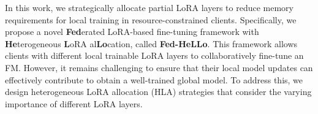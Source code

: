 \documentclass[lettersize,journal]{IEEEtran}
\begin{document}
In this work, we strategically allocate partial LoRA layers to reduce memory requirements for local training in resource-constrained clients.
Specifically, we propose a novel \textbf{Fed}erated LoRA-based fine-tuning framework with \textbf{He}terogeneous \textbf{L}oRA al\textbf{Lo}cation, called \textbf{Fed-HeLLo}. 
This framework allows clients with different local trainable LoRA layers to collaboratively fine-tune an FM. 
However, it remains challenging to ensure that their local model updates can effectively contribute to obtain a well-trained global model. 
To address this, we design heterogeneous LoRA allocation (HLA) strategies that consider the varying importance of different LoRA layers.
%
% 
% 
\end{document}
